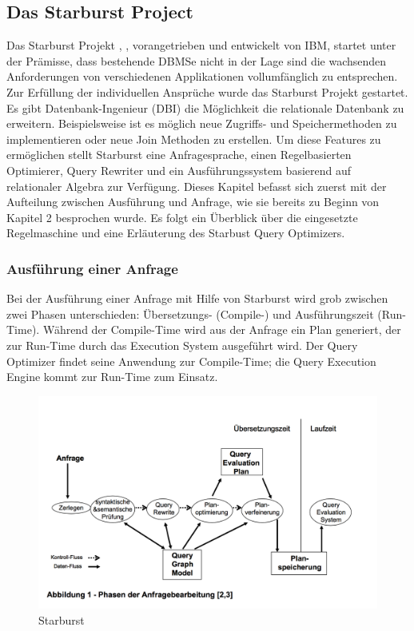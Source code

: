 \subsection{Das Starburst Project}

Das Starburst Projekt \cite{lohman1988Starbust}, \cite{haas1989extensible}, vorangetrieben und entwickelt von IBM,  startet unter der Prämisse, dass bestehende DBMSe nicht in der Lage sind die wachsenden Anforderungen von verschiedenen Applikationen vollumfänglich zu entsprechen. Zur Erfüllung der individuellen Ansprüche wurde das Starburst Projekt gestartet. Es gibt Datenbank-Ingenieur (DBI) die Möglichkeit die relationale Datenbank zu erweitern. Beispielsweise ist es möglich neue Zugriffs- und Speichermethoden zu implementieren oder neue Join Methoden zu erstellen. Um diese Features zu ermöglichen stellt Starburst eine Anfragesprache, einen Regelbasierten Optimierer, Query Rewriter und ein Ausführungssystem basierend auf relationaler Algebra zur Verfügung. Dieses Kapitel befasst sich zuerst mit der Aufteilung zwischen Ausführung und Anfrage, wie sie bereits zu Beginn von Kapitel 2 besprochen wurde. Es folgt ein Überblick über die eingesetzte Regelmaschine und eine Erläuterung des Starbust Query Optimizers.

\subsubsection{Ausführung einer Anfrage}

Bei der Ausführung einer Anfrage mit Hilfe von Starburst wird grob zwischen zwei Phasen unterschieden: Übersetzungs- (Compile-) und Ausführungszeit (Run-Time). Während der Compile-Time wird aus der Anfrage ein Plan generiert, der zur Run-Time durch das Execution System ausgeführt wird. Der Query Optimizer findet seine Anwendung zur Compile-Time; die Query Execution Engine kommt zur Run-Time zum Einsatz.

\begin{figure}[h]
  \centering
  \includegraphics[width=\textwidth]{02_Grundlagen/Starburst.png}
  \caption{Starburst}
\end{figure}

